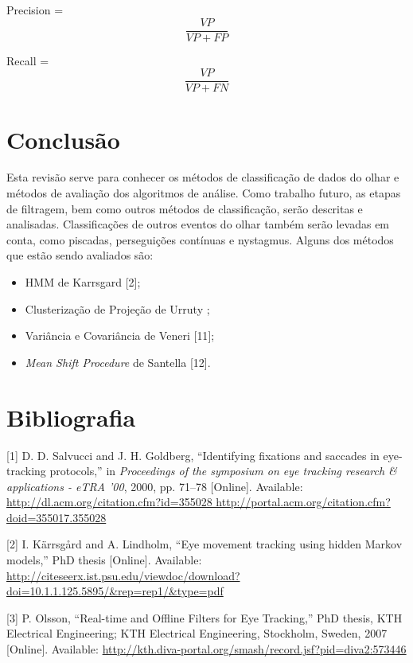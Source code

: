 \documentclass[brazil,]{report}
\begin{document}
Precision = \[\frac{VP}{VP+FP}\]

Recall = \[\frac{VP}{VP+FN}\]

\chapter{Conclusão}\label{conclusuxe3o}

Esta revisão serve para conhecer os métodos de classificação de dados do
olhar e métodos de avaliação dos algoritmos de análise. Como trabalho
futuro, as etapas de filtragem, bem como outros métodos de
classificação, serão descritas e analisadas. Classificações de outros
eventos do olhar também serão levadas em conta, como piscadas,
perseguições contínuas e nystagmus. Alguns dos métodos que estão sendo
avaliados são:

\begin{itemize}
\itemsep1pt\parskip0pt
\item
  HMM de Karrsgard {[}2{]};
\item
  Clusterização de Projeção de Urruty ;
\item
  Variância e Covariância de Veneri {[}11{]};
\item
  \emph{Mean Shift Procedure} de Santella {[}12{]}.
\end{itemize}

\chapter{Bibliografia}\label{bibliografia}

{[}1{]} D. D. Salvucci and J. H. Goldberg, ``Identifying fixations and
saccades in eye-tracking protocols,'' in \emph{Proceedings of the
symposium on eye tracking research \& applications - eTRA '00}, 2000,
pp. 71--78 {[}Online{]}. Available:
\href{http://dl.acm.org/citation.cfm?id=355028 http://portal.acm.org/citation.cfm?doid=355017.355028}{http://dl.acm.org/citation.cfm?id=355028
http://portal.acm.org/citation.cfm?doid=355017.355028}

{[}2{]} I. Kärrsgård and A. Lindholm, ``Eye movement tracking using
hidden Markov models,'' PhD thesis {[}Online{]}. Available:
\url{http://citeseerx.ist.psu.edu/viewdoc/download?doi=10.1.1.125.5895/\&rep=rep1/\&type=pdf}

{[}3{]} P. Olsson, ``Real-time and Offline Filters for Eye Tracking,''
PhD thesis, KTH Electrical Engineering; KTH Electrical Engineering,
Stockholm, Sweden, 2007 {[}Online{]}. Available:
\url{http://kth.diva-portal.org/smash/record.jsf?pid=diva2:573446}
\end{document}
